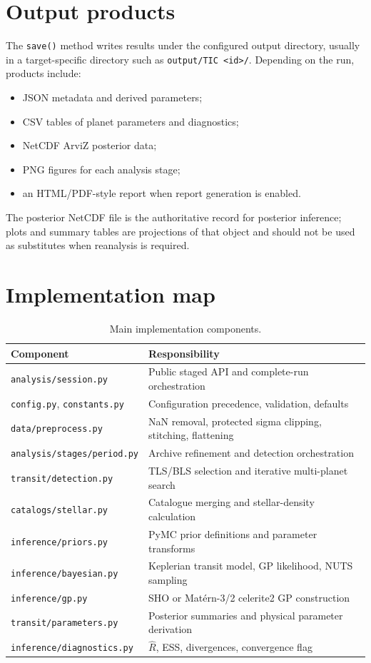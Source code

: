 \documentclass[12pt,a4paper,oneside]{report}
\newcommand{\code}[1]{\texttt{\small #1}}
\begin{document}
\section{Output products}
The \code{save()} method writes results under the configured output directory,
usually in a target-specific directory such as \code{output/TIC <id>/}. Depending
on the run, products include:
\begin{itemize}
  \item JSON metadata and derived parameters;
  \item CSV tables of planet parameters and diagnostics;
  \item NetCDF ArviZ posterior data;
  \item PNG figures for each analysis stage;
  \item an HTML/PDF-style report when report generation is enabled.
\end{itemize}
The posterior NetCDF file is the authoritative record for posterior inference;
plots and summary tables are projections of that object and should not be used
as substitutes when reanalysis is required.

\section{Implementation map}
\begin{longtable}{p{}p{}}
\caption{Main implementation components.}\label{tab:files}\\
\toprule
Component & Responsibility\\
\midrule
\code{analysis/session.py} & Public staged API and complete-run orchestration\\
\code{config.py}, \code{constants.py} & Configuration precedence, validation, defaults\\
\code{data/preprocess.py} & NaN removal, protected sigma clipping, stitching, flattening\\
\code{analysis/stages/period.py} & Archive refinement and detection orchestration\\
\code{transit/detection.py} & TLS/BLS selection and iterative multi-planet search\\
\code{catalogs/stellar.py} & Catalogue merging and stellar-density calculation\\
\code{inference/priors.py} & PyMC prior definitions and parameter transforms\\
\code{inference/bayesian.py} & Keplerian transit model, GP likelihood, NUTS sampling\\
\code{inference/gp.py} & SHO or Matérn-3/2 celerite2 GP construction\\
\code{transit/parameters.py} & Posterior summaries and physical parameter derivation\\
\code{inference/diagnostics.py} & \(\hat R\), ESS, divergences, convergence flag\\
\bottomrule
\end{longtable}
\end{document}
